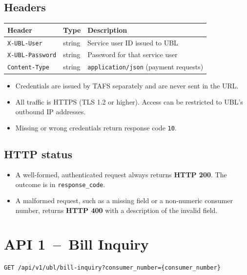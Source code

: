 \documentclass[11pt]{article}
\begin{document}
\subsection{Headers}
\begin{center}
\begin{tabular}{@{}lll@{}}
\toprule
\textbf{Header} & \textbf{Type} & \textbf{Description} \\
\midrule
\texttt{X-UBL-User} & string & Service user ID issued to UBL \\
\texttt{X-UBL-Password} & string & Password for that service user \\
\texttt{Content-Type} & string & \texttt{application/json} (payment requests) \\
\bottomrule
\end{tabular}
\end{center}
\begin{itemize}[nosep]
  \item Credentials are issued by TAFS separately and are never sent in the URL.
  \item All traffic is HTTPS (TLS 1.2 or higher). Access can be restricted to UBL's outbound IP addresses.
  \item Missing or wrong credentials return response code \texttt{10}.
\end{itemize}

\subsection{HTTP status}
\begin{itemize}[nosep]
  \item A well-formed, authenticated request always returns \textbf{HTTP 200}. The outcome is in \texttt{response\_code}.
  \item A malformed request, such as a missing field or a non-numeric consumer number, returns \textbf{HTTP 400} with a
        description of the invalid field.
\end{itemize}

\section{API 1 \,--\, Bill Inquiry}

\begin{lstlisting}
GET /api/v1/ubl/bill-inquiry?consumer_number={consumer_number}
\end{lstlisting}
\end{document}
